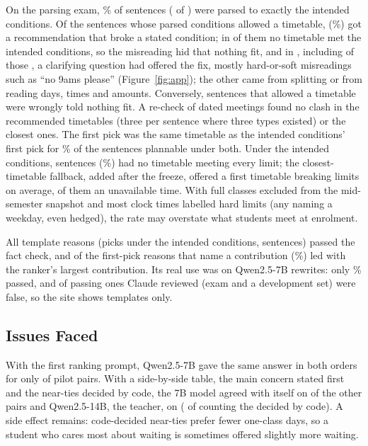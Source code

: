 On the parsing exam, \plExact\% of sentences (\plExactN{} of \sExamS) were parsed to exactly the intended conditions. Of the \plPlannable{} sentences whose parsed conditions allowed a timetable, \plViol{} (\plViolPct\%) got a recommendation that broke a stated condition; in \plViolNoGold{} of them no timetable met the intended conditions, so the misreading hid that nothing fit, and in \plViolFix{}, including \plViolBoth{} of those \plViolNoGold{}, a clarifying question had offered the fix, mostly hard-or-soft misreadings such as ``no 9ams please'' (Figure~\ref{fig:app}); the other \plViolOther{} came from splitting or from reading days, times and amounts. Conversely, \plFalseNoFit{} sentences that allowed a timetable were wrongly told nothing fit. A re-check of dated meetings found no clash in the \plPicksN{} recommended timetables (three per sentence where three types existed) or the \plNearestPicks{} closest ones. The first pick was the same timetable as the intended conditions' first pick for \plSameFirst\% of the \plSameFirstOf{} sentences plannable under both. Under the intended conditions, \plNoFit{} sentences (\plNoFitPct\%) had no timetable meeting every limit; the closest-timetable fallback, added after the freeze, offered a first timetable breaking \plNoFitBreaks{} limits on average, \plNoFitWindow{} of them an unavailable time. With full classes excluded from the mid-semester snapshot and most clock times labelled hard limits (any naming a weekday, even hedged), the rate may overstate what students meet at enrolment.

All \exPicks{} template reasons (picks under the intended conditions, \figStudents{} sentences) passed the fact check, and \exMainN{} of the \exMainOf{} first-pick reasons that name a contribution (\exMain\%) led with the ranker's largest contribution. Its real use was on Qwen2.5-7B rewrites: only \exRewrite\% passed, and \exManualWrong{} of \exManualOf{} passing ones Claude reviewed (exam and a development set) were false, so the site shows templates only.

\subsection{Issues Faced}\label{sec:issue}

With the first ranking prompt, Qwen2.5-7B gave the same answer in both orders for only \tPilotFirst{} of \tPilotN{} pilot pairs. With a side-by-side table, the main concern stated first and the \tPilotCodeN{} near-ties decided by code, the 7B model agreed with itself on \tPilotSevenOK{} of the other \tPilotAsked{} pairs and Qwen2.5-14B, the teacher, on \tPilotAskedOK{} (\tPilotFinal{} of \tPilotN{} counting the \tPilotCodeN{} decided by code). A side effect remains: code-decided near-ties prefer fewer one-class days, so a student who cares most about waiting is sometimes offered slightly more waiting.
